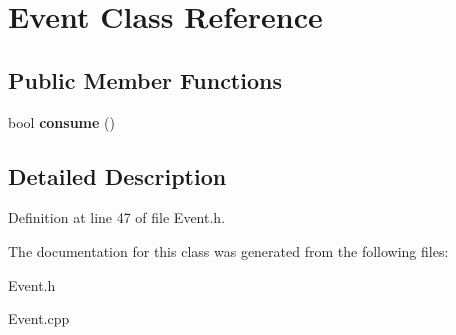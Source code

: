 \hypertarget{class_event}{}\section{Event Class Reference}
\label{class_event}
\subsection*{Public Member Functions}
\begin{DoxyCompactItemize}
\item 
\mbox{\label{class_event_a93521bedffd2a0b9c979e15241e060ba}} 
bool {\bfseries consume} ()
\end{DoxyCompactItemize}


\subsection{Detailed Description}


Definition at line 47 of file Event.\+h.



The documentation for this class was generated from the following files\+:\begin{DoxyCompactItemize}
\item 
Event.\+h\item 
Event.\+cpp\end{DoxyCompactItemize}
